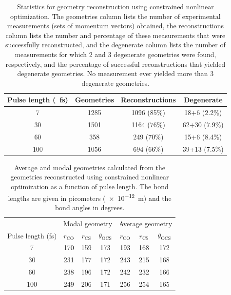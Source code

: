 \begin{table}
  \myfloatalign
  \centering
  \begin{tabularx}{\textwidth}{cccc}
    \toprule
    Pulse length (\SI{}{\fs}) & Geometries & Reconstructions & Degenerate \\
    \midrule
    7 & 1285 & 1096 (85\%) & 18+6 (2.2\%) \\
    30 & 1501 & 1164 (76\%) & 62+30 (7.9\%) \\
    60 & 358 & 249 (70\%) & 15+6 (8.4\%) \\
    100 & 1056 & 694 (66\%) & 39+13 (7.5\%) \\
    \bottomrule
  \end{tabularx}
  \caption[Statistics for geometry reconstruction using constrained nonlinear optimization as a function of pulse length.]
  {Statistics for geometry reconstruction using constrained nonlinear optimization. The geometries column lists the number of experimental measurements (sets of momentum vectors) obtained, the reconstructions column lists the number and percentage of these measurements that were successfully reconstructed, and the degenerate column lists the number of measurements for which 2 and 3 degenerate geometries were found, respectively, and the percentage of successful reconstructions that yielded degenerate geometries. No measurement ever yielded more than 3 degenerate geometries.}
  \label{table:MOSuccess}
\end{table}

\begin{table}
  \myfloatalign
  \centering
  \begin{tabularx}{0.85\textwidth}{ccccccc}
    \toprule
    & \multicolumn{3}{c}{Modal geometry} & \multicolumn{3}{c}{Average geometry} \\
    Pulse length (fs) & $r_\mathrm{CO}$ & $r_\mathrm{CS}$ & $\theta_\mathrm{OCS}$ & $r_\mathrm{CO}$ & $r_\mathrm{CS}$ & $\theta_\mathrm{OCS}$ \\
    \midrule
    7 & 170 & 159 & 173 & 193 & 168 & 172 \\
    30 & 231 & 177 & 172 & 243 & 215 & 168 \\
    60 & 238 & 196 & 172 & 242 & 232 & 166 \\
    100 & 249 & 206 & 171 & 256 & 254 & 165 \\
    \bottomrule
  \end{tabularx}
  \caption[Average and modal geometries reconstructed using constrained nonlinear optimization as a function of pulse length.]
  {Average and modal geometries calculated from the geometries reconstructed using constrained nonlinear optimization as a function of pulse length. The bond lengths are given in picometers (\SI{e-12}{\m}) and the bond angles in degrees.}
  \label{table:MOGeometries}
\end{table}

